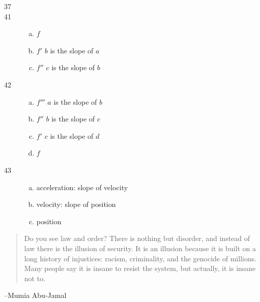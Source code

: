 \documentclass[letterpaper]{exam}
\begin{document}
\begin{description}
      \item[37] 

      \item[41] 
        \begin{enumerate}[(a)]
          \item $f$
          \item $f'$ $b$ is the slope of $a$
          \item $f''$ $c$ is the slope of $b$
        \end{enumerate}

      \item[42] 
        \begin{enumerate}[(a)]
          \item $f'''$ $a$ is the slope of $b$
          \item $f''$ $b$ is the slope of $c$
          \item $f'$ $c$ is the slope of $d$
          \item $f$ 
        \end{enumerate}

      \item[43]
        \begin{enumerate}[(a)]
          \item acceleration: slope of velocity
          \item velocity: slope of position
          \item position
        \end{enumerate}

     \end{description}
 
  \else
    \vspace{10 cm}
    \begin{quote}
      \begin{em}
        Do you see law and order? There is nothing but disorder, and instead of law there
        is the illusion of security. It is an illusion because it is built on a long
        history of injustices: racism, criminality, and the genocide of millions. Many
        people say it is insane to resist the system, but actually, it is insane not to. 
      \end{em}
    \end{quote}
    \hspace{2 cm} --Mumia Abu-Jamal
  \fi
\end{document}
